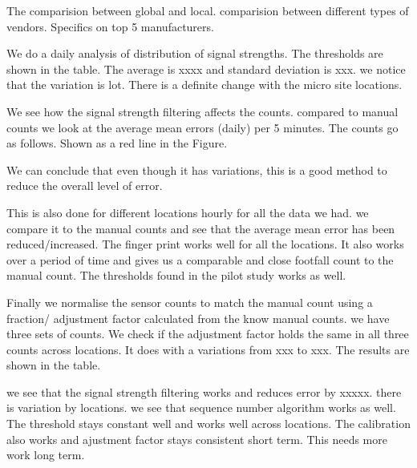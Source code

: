 The comparision between global and local.
comparision between different types of vendors.
Specifics on top 5 manufacturers.

We do a daily analysis of distribution of signal strengths.
The thresholds are shown in the table.
The average is xxxx and standard deviation is xxx.
we notice that the variation is lot. There is a definite
change with the micro site locations.

We see how the signal strength filtering affects the counts.
compared to manual counts we look at the average mean errors (daily)
per 5 minutes. The counts go as follows.
Shown as a red line in the Figure.

We can conclude that even though it has variations, this is
a good method to reduce the overall level of error.

This is also done for different locations hourly for all the data we had.
we compare it to the manual counts and see that the average mean error
has been reduced/increased. The finger print works well for all the locations.
It also works over a period of time and gives us a comparable and close 
footfall count to the manual count. The thresholds found in the pilot study
works as well.

Finally we normalise the sensor counts to match the manual count using
a fraction/ adjustment factor calculated from the know manual counts.
we have three sets of counts. We check if the adjustment factor holds the
same in all three counts across locations. It does with a variations from
xxx to xxx. The results are shown in the table. 

we see that the signal strength filtering works and reduces error by
xxxxx. there is variation by locations.
we see that sequence number algorithm works as well. The threshold stays
constant well and works well across locations. The calibration also works
and ajustment factor stays consistent short term. This needs more work 
long term.
